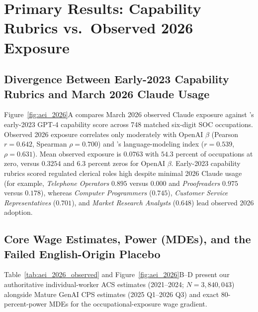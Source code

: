 \documentclass[11pt]{amsart}
\begin{document}
\section{Primary Results: Capability Rubrics vs.\ Observed 2026 Exposure}

\subsection{Divergence Between Early-2023 Capability Rubrics and March 2026 Claude Usage}

Figure~\ref{fig:aei_2026}A compares March 2026 observed Claude exposure \citep{MassenkoffMcCrory2026} against \citet{Eloundou2024}'s early-2023 GPT-4 capability score across 748 matched six-digit SOC occupations. Observed 2026 exposure correlates only moderately with OpenAI $\beta$ (Pearson $r = 0.642$, Spearman $\rho = 0.700$) and \citet{Felten2023}'s language-modeling index ($r = 0.539$, $\rho = 0.631$). Mean observed exposure is $0.0763$ with $54.3$ percent of occupations at zero, versus $0.3254$ and $6.3$ percent zeros for OpenAI $\beta$. Early-2023 capability rubrics scored regulated clerical roles high despite minimal 2026 Claude usage (for example, \emph{Telephone Operators} $0.895$ versus $0.000$ and \emph{Proofreaders} $0.975$ versus $0.178$), whereas \emph{Computer Programmers} ($0.745$), \emph{Customer Service Representatives} ($0.701$), and \emph{Market Research Analysts} ($0.648$) lead observed 2026 adoption.

\subsection{Core Wage Estimates, Power (MDEs), and the Failed English-Origin Placebo}

Table~\ref{tab:aei_2026_observed} and Figure~\ref{fig:aei_2026}B--D present our authoritative individual-worker ACS estimates (2021--2024; $N = 3{,}840{,}043$) alongside Mature GenAI CPS estimates (2025 Q1--2026 Q3) and exact 80-percent-power MDEs for the occupational-exposure wage gradient.


\end{document}

